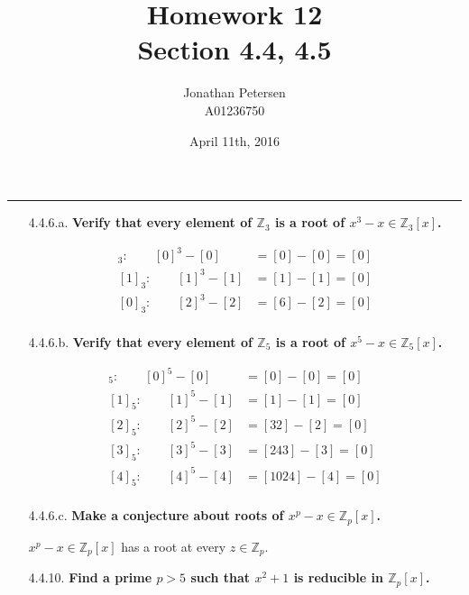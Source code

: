 \documentclass{article}
\title{Homework 12 \\ Section 4.4, 4.5}
\author{Jonathan Petersen \\ A01236750}
\date{April 11th, 2016}
\begin{document}
	\maketitle
	\hrule 
	\vspace{5mm}
	\begin{enumerate}
		\item [4.4.6.a.] \textbf{Verify that every element of $\mathbb{Z}_3$ is a root of $x^3 - x
								 \in \mathbb{Z}_3[x]$.}
		
			\begin{align*}
				[0]_3: \qquad [0]^3 - [0] & = [0] - [0] = [0] \\
				[1]_3: \qquad [1]^3 - [1] & = [1] - [1] = [0] \\
				[0]_3: \qquad [2]^3 - [2] & = [6] - [2] = [0] \\
			\end{align*}

		\item [4.4.6.b.] \textbf{Verify that every element of $\mathbb{Z}_5$ is a root of $x^5 - x
								 \in \mathbb{Z}_5[x]$.}

			\begin{align*}
				[0]_5: \qquad [0]^5 - [0] & = [0] - [0] = [0] \\
				[1]_5: \qquad [1]^5 - [1] & = [1] - [1] = [0] \\
				[2]_5: \qquad [2]^5 - [2] & = [32] - [2] = [0] \\
				[3]_5: \qquad [3]^5 - [3] & = [243] - [3] = [0] \\
				[4]_5: \qquad [4]^5 - [4] & = [1024] - [4] = [0] \\
			\end{align*}

		\item [4.4.6.c.] \textbf{Make a conjecture about roots of $x^p - x \in \mathbb{Z}_p[x]$.}

			$x^p - x \in \mathbb{Z}_p[x]$ has a root at every $z \in \mathbb{Z}_p$.

		\item [4.4.10.] \textbf{Find a prime $p > 5$ such that $x^2 + 1$ is reducible in 
								$\mathbb{Z}_p[x]$.}


\end{enumerate}
\end{document}

